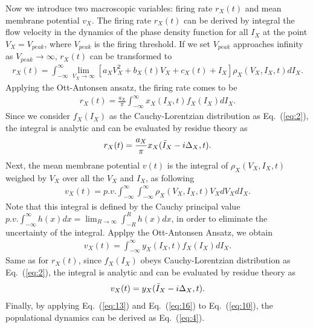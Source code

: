 \documentclass[10pt,letterpaper]{article}
\begin{document}
Now we introduce two macroscopic variables: firing rate $r_{X}(t)$ and mean membrane potential $v_{X}$. The firing rate  $r_{X}(t)$ can be derived by integral the flow velocity in the dynamics of the phase density function for all $I_{X}$ at the point $V_{X}=V_{peak}$, where $V_{peak}$ is the firing threshold. If we set $V_{peak}$ approaches infinity as $V_{peak}\xrightarrow{}\infty$, $r_{X}(t)$ can be transformed to 
\begin{eqnarray}
\label{eq:11}
    r_{X}(t)= \int_{-\infty}^{\infty} \lim_{V_{X}\to\infty} \left[ a_{X}V_{X}^{2}+b_{X}(t)V_{X}+c_{X}(t)+I_{X}\right]\rho_{X}(V_{X},I_{X},t)dI_{X}.
\end{eqnarray}
Applying the Ott-Antonsen ansatz, the firing rate comes to be
\begin{eqnarray}
\label{eq:12}
    r_{X}(t)= \frac{a_{X}}{\pi}\int_{-\infty}^{\infty}x_{X}(I_{X},t)f_{X}(I_{X})dI_{X}.
\end{eqnarray}
Since we consider $f_{X}(I_{X})$ as the Cauchy-Lorentzian distribution as Eq.~(\ref{eq:2}), the integral is analytic and can be evaluated by residue theory as
\begin{eqnarray}
\label{eq:13}
    r_{X}(t)= \frac{a_{X}}{\pi}x_{X}(\Bar{I}_{X}-i\Delta_{X},t).
\end{eqnarray}
Next, the mean membrane potential $v(t)$ is the integral of $\rho_{X}(V_{X},I_{X},t)$ weighed by $V_{X}$ over all the $V_{X}$ and $I_{X}$, as following
\begin{eqnarray}
\label{eq:14}
    v_{X}(t) = p.v.\int_{-\infty}^{\infty}\int_{-\infty}^{\infty}\rho_{X}(V_{X},I_{X},t)V_{X}dV_{X}dI_{X}.
\end{eqnarray}
Note that this integral is defined by the Cauchy principal value $p.v.\int_{-\infty}^{\infty} h(x)dx = \lim_{R\xrightarrow{}\infty}\int_{-R}^{R}h(x)dx$, in order to eliminate the uncertainty of the integral. Applpy the Ott-Antonsen Ansatz, we obtain
\begin{eqnarray}
\label{eq:15}
    v_{X}(t) = \int_{-\infty}^{\infty}y_{X}(I_{X},t)f_{X}(I_{X})dI_{X}.
\end{eqnarray}
Same as for $r_{X}(t)$, since $f_{X}(I_{X})$ obeys Cauchy-Lorentzian distribution as Eq.~(\ref{eq:2}), the integral is analytic and can be evaluated by residue theory as
\begin{eqnarray}
\label{eq:16}
    v_{X}(t) = y_{X}(\Bar{I}_{X}-i\Delta_{X},t).
\end{eqnarray}
Finally, by applying Eq.~(\ref{eq:13}) and Eq.~(\ref{eq:16}) to Eq.~(\ref{eq:10}), the populational dynamics can be derived as Eq.~(\ref{eq:4}).
\end{document}
